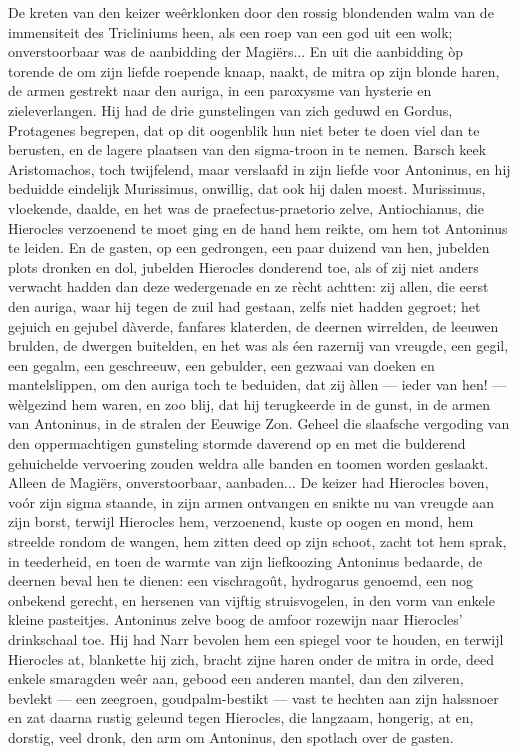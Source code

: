 \documentclass[a4paper, 12pt, oneside, dutch]{article}
\begin{document}
De kreten van den keizer weêrklonken door den rossig blondenden walm van de immensiteit des Tricliniums heen, als een roep van een god uit een wolk; onverstoorbaar was de aanbidding der Magiërs... En uit die aanbidding òp torende de om zijn liefde roepende knaap, naakt, de mitra op zijn blonde haren, de armen gestrekt naar den auriga, in een paroxysme van hysterie en zieleverlangen. Hij had de drie gunstelingen van zich geduwd en Gordus, Protagenes begrepen, dat op dit oogenblik hun niet beter te doen viel dan te berusten, en de lagere plaatsen van den sigma-troon in te nemen. Barsch keek Aristomachos, toch twijfelend, maar verslaafd in zijn liefde voor Antoninus, en hij beduidde eindelijk Murissimus, onwillig, dat ook hij dalen moest. Murissimus, vloekende, daalde, en het was de praefectus-praetorio zelve, Antiochianus, die Hierocles verzoenend te moet ging en de hand hem reikte, om hem tot Antoninus te leiden. En de gasten, op een gedrongen, een paar duizend van hen, jubelden plots dronken en dol, jubelden Hierocles donderend toe, als of zij niet anders verwacht hadden dan deze wedergenade en ze rècht achtten: zij allen, die eerst den auriga, waar hij tegen de zuil had gestaan, zelfs niet hadden gegroet; het gejuich en gejubel dàverde, fanfares klaterden, de deernen wirrelden, de leeuwen brulden, de dwergen buitelden, en het was als éen razernij van vreugde, een gegil, een gegalm, een geschreeuw, een gebulder, een gezwaai van doeken en mantelslippen, om den auriga toch te beduiden, dat zij àllen --- ieder van hen! --- wèlgezind hem waren, en zoo blij, dat hij terugkeerde in de gunst, in de armen van Antoninus, in de stralen der Eeuwige Zon. Geheel die slaafsche vergoding van den oppermachtigen gunsteling stormde daverend op en met die bulderend gehuichelde vervoering zouden weldra alle banden en toomen worden geslaakt. Alleen de Magiërs, onverstoorbaar, aanbaden... De keizer had Hierocles boven, voór zijn sigma staande, in zijn armen ontvangen en snikte nu van vreugde aan zijn borst, terwijl Hierocles hem, verzoenend, kuste op oogen en mond, hem streelde rondom de wangen, hem zitten deed op zijn schoot, zacht tot hem sprak, in teederheid, en toen de warmte van zijn liefkoozing Antoninus bedaarde, de deernen beval hen te dienen: een vischragoût, hydrogarus genoemd, een nog onbekend gerecht, en hersenen van vijftig struisvogelen, in den vorm van enkele kleine pasteitjes. Antoninus zelve boog de amfoor rozewijn naar Hierocles' drinkschaal toe. Hij had Narr bevolen hem een spiegel voor te houden, en terwijl Hierocles at, blankette hij zich, bracht zijne haren onder de mitra in orde, deed enkele smaragden weêr aan, gebood een anderen mantel, dan den zilveren, bevlekt --- een zeegroen, goudpalm-bestikt --- vast te hechten aan zijn halssnoer en zat daarna rustig geleund tegen Hierocles, die langzaam, hongerig, at en, dorstig, veel dronk, den arm om Antoninus, den spotlach over de gasten.
\end{document}
